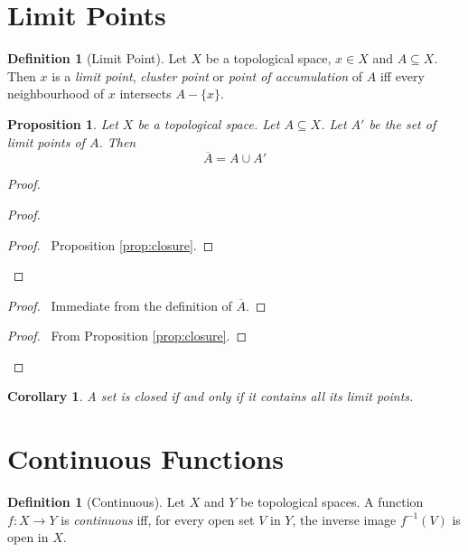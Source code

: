 \documentclass{book}
\let\qed\relax
\newtheorem{prop}[ax]{Proposition}
\newtheorem{cor}{Corollary}[ax]
\theoremstyle{definition}
\newtheorem{df}[ax]{Definition}
\newcommand{\inv}[1]{\ensuremath{{#1}^{-1}}}
\begin{document}
\section{Limit Points}

\begin{df}[Limit Point]
Let $X$ be a topological space, $x \in X$ and $A \subseteq X$. Then $x$ is a \emph{limit point}, \emph{cluster point} or \emph{point of accumulation} of $A$ iff every neighbourhood of $x$ intersects $A - \{x\}$.
\end{df}

\begin{prop}
Let $X$ be a topological space. Let $A \subseteq X$. Let $A'$ be the set of limit points of $A$. Then
\[ \overline{A} = A \cup A' \]
\end{prop}

\begin{proof}
\pf
{}
\begin{proof}
	\begin{proof}
		\pf\ Proposition \ref{prop:closure}.
	\end{proof}
\end{proof}
\begin{proof}
	\pf\ Immediate from the definition of $\overline{A}$.
\end{proof}
\begin{proof}
	\pf\ From Proposition \ref{prop:closure}.
\end{proof}
\qed
\end{proof}

\begin{cor}
A set is closed if and only if it contains all its limit points.
\end{cor}

\section{Continuous Functions}

\begin{df}[Continuous]
Let $X$ and $Y$ be topological spaces. A function $f : X \rightarrow Y$ is \emph{continuous} iff, for every open set $V$ in $Y$, the inverse image $\inv{f}(V)$ is open in $X$.
\end{df}
\end{document}
